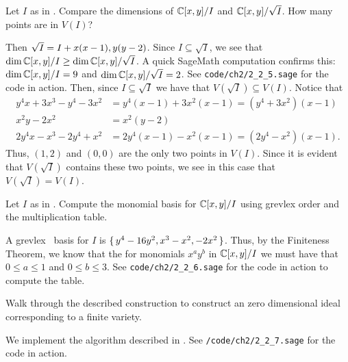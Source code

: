 \documentclass[letterpaper, 11pt, oneside]{book}
\begin{document}
\begin{exercise}\label{ex:UAG_2.2.4}
\end{exercise}

\clearpage

\begin{exercise}\label{ex:UAG_2.2.5}
  Let $I$ as in .
  Compare the dimensions of $\mathbb{C}[x, y] / I$ and $\mathbb{C}[x, y] / \sqrt{I}$.
  How many points are in $V(I)$?
\end{exercise}
\begin{pf}
  Then $\sqrt{I} = I + \gen{x(x - 1), y(y - 2)}$.
  Since $I \subseteq \sqrt{I}$, we see that $\dim \mathbb{C}[x, y] / I \geq \dim \mathbb{C}[x, y] / \sqrt{I}$.
  A quick SageMath computation confirms this: $\dim \mathbb{C}[x, y] / I = 9$ and $\dim \mathbb{C}[x, y] / \sqrt{I} = 2$.
  See \texttt{code/ch2/2\_2\_5.sage} for the code in action.
  Then, since $I \subseteq \sqrt{I}$ we have that $V(\sqrt{I}) \subseteq V(I)$.
  Notice that
  \begin{align*}
    y^{4}x + 3x^{3} - y^{4} - 3x^{2} &= y^{4}(x - 1) + 3x^{2}(x - 1) = (y^{4} + 3x^{2})(x - 1) \\
    x^{2}y - 2x^{2} &= x^{2}(y - 2) \\
    2y^{4}x - x^{3} - 2y^{4} + x^{2} &= 2y^{4}(x - 1) - x^{2}(x - 1) = (2y^{4} - x^{2})(x - 1).
  \end{align*}
  Thus, $(1, 2)$ and $(0, 0)$ are the only two points in $V(I)$.
  Since it is evident that $V(\sqrt{I})$ contains these two points, we see in this case that $V(\sqrt{I}) = V(I)$.
\end{pf}

\begin{exercise}\label{ex:UAG_2.2.6}
  Let $I$ as in .
  Compute the monomial basis for $\mathbb{C}[x, y] / I$ using grevlex order and the multiplication table.
\end{exercise}
\begin{pf}
  A grevlex \Grobner\ basis for $I$ is $\set{y^{4} - 16y^{2}, x^{3} - x^{2}, -2x^{2}}$.
  Thus, by the Finiteness Theorem, we know that the for monomials $x^{a}y^{b}$ in $\mathbb{C}[x, y] / I$ we must have that $0 \leq a \leq 1$ and $0 \leq b \leq 3$.
  See \texttt{code/ch2/2\_2\_6.sage} for the code in action to compute the table.
\end{pf}

\begin{exercise}\label{ex:UAG_2.2.7}
  Walk through the described construction to construct an zero dimensional ideal corresponding to a finite variety.
\end{exercise}
\begin{pf}
  We implement the algorithm described in .
  See \texttt{/code/ch2/2\_2\_7.sage} for the code in action.
\end{pf}

\printbibliography
\end{document}
